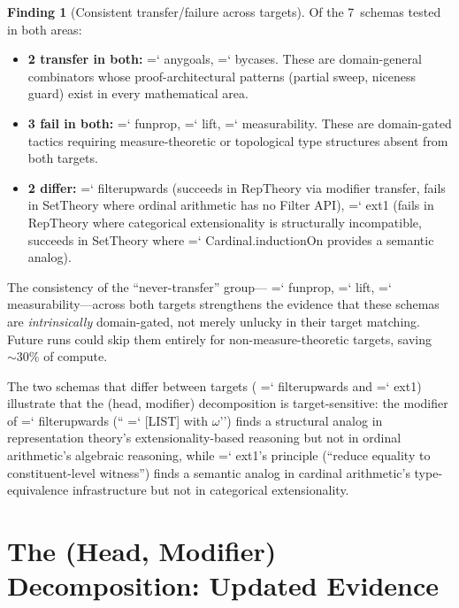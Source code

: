\documentclass[11pt]{article}
\renewcommand{\texttt}[1]{%
  \begingroup\ttfamily\hyphenchar\font=`\-\relax
  \def\_{\textunderscore\discretionary{}{}{}}%
  #1\endgroup}
\theoremstyle{definition}
\newtheorem{finding}[theorem]{Finding}
\theoremstyle{remark}
\begin{document}
\begin{finding}[Consistent transfer/failure across targets]\label{find:consistency}
Of the 7~schemas tested in both areas:
\begin{itemize}
\item \textbf{2 transfer in both:} \texttt{any\_goals},
  \texttt{by\_cases}.  These are domain-general combinators whose
  proof-architectural patterns (partial sweep, niceness guard) exist
  in every mathematical area.
\item \textbf{3 fail in both:} \texttt{fun\_prop},
  \texttt{lift}, \texttt{measurability}.  These are domain-gated
  tactics requiring measure-theoretic or topological type structures
  absent from both targets.
\item \textbf{2 differ:} \texttt{filter\_upwards} (succeeds in
  RepTheory via modifier transfer, fails in SetTheory where
  ordinal arithmetic has no Filter API),
  \texttt{ext1} (fails in RepTheory where categorical
  extensionality is structurally incompatible, succeeds in
  SetTheory where \texttt{Cardinal.inductionOn} provides a semantic
  analog).
\end{itemize}
\end{finding}

The consistency of the ``never-transfer'' group---\texttt{fun\_prop},
\texttt{lift}, \texttt{measurability}---across both targets
strengthens the evidence that these schemas are \emph{intrinsically}
domain-gated, not merely unlucky in their target matching.  Future
runs could skip them entirely for non-measure-theoretic targets,
saving ${\sim}30$\% of compute.

The two schemas that differ between targets (\texttt{filter\_upwards}
and \texttt{ext1}) illustrate that the (head, modifier) decomposition
is target-sensitive: the modifier of \texttt{filter\_upwards}
(``\texttt{[LIST] with $\omega$}'') finds a structural analog in
representation theory's extensionality-based reasoning but not in
ordinal arithmetic's algebraic reasoning, while \texttt{ext1}'s
principle (``reduce equality to constituent-level witness'') finds
a semantic analog in cardinal arithmetic's type-equivalence
infrastructure but not in categorical extensionality.

\section{The (Head, Modifier) Decomposition: Updated Evidence}%
\label{sec:finding}
\end{document}
